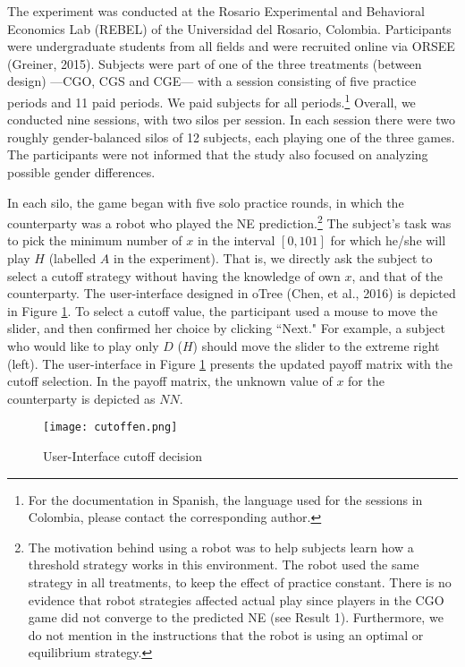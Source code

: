 \documentclass[12pt, letterpaper]{article}
\theoremstyle{plain}
\begin{document}
The experiment was conducted at the Rosario Experimental and Behavioral Economics Lab (REBEL) of the Universidad del Rosario, Colombia. Participants were undergraduate students from all fields and were recruited online via ORSEE (Greiner, 2015). Subjects were part of one of the three treatments (between design) ---CGO, CGS and CGE---  with  a session consisting of five practice periods and 11 paid periods. We paid subjects for all periods.\footnote{For the documentation in Spanish, the language used for the sessions in Colombia, please contact the corresponding author.} Overall, we conducted nine sessions, with two silos per session. In each session there were two roughly gender-balanced silos of 12 subjects, each playing one of the three games. The participants were not informed that the study also focused on analyzing possible gender differences.

In each silo, the game began with five solo practice rounds, in which the counterparty was a robot who played the NE prediction.\footnote{The motivation behind using a robot was to help subjects learn how a threshold strategy works in this environment. The robot used the same strategy in all treatments, to keep the effect of practice constant. There is no evidence that robot strategies affected actual play since players in the CGO game did not converge to the predicted NE (see Result 1). Furthermore, we do not mention in the instructions that the robot is using an optimal or equilibrium strategy.} The subject's task was to pick the minimum number of $x$ in the interval $[0,101]$ for which he/she will play $H$ (labelled $A$ in the experiment). That is, we directly ask the subject to select a cutoff strategy without having the knowledge of own $x$, and that of the counterparty. The user-interface designed in oTree (Chen, et al., 2016) is depicted in Figure \ref{fig:ui}. To select a cutoff value, the participant used a mouse to move the slider, and then confirmed her choice by clicking ``Next." For example, a subject who would like to play only $D$ ($H$) should move the slider to the extreme right (left). The user-interface in Figure \ref{fig:ui} presents the updated payoff matrix with the cutoff selection. In the payoff matrix, the unknown value of $x$ for the counterparty is depicted as $NN$.

\begin{center}
\begin{figure}[ht]
\centering{}%
\texttt{[image: cutoffen.png]}%
\caption{User-Interface cutoff decision} 
\label{fig:ui}
\end{figure}
\end{center}
\end{document}
